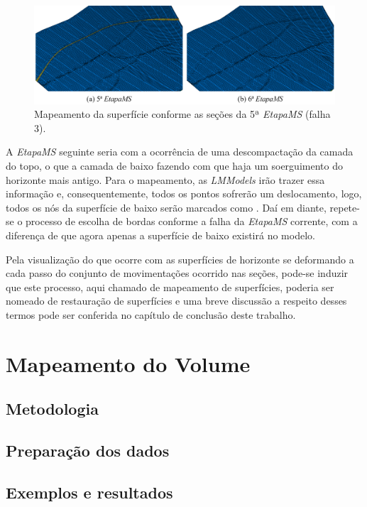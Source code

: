 \begin{figure} [H]
  \begin{center}
    \includegraphics[width=\textwidth]{images/fig-example-2-12}
    \caption{Mapeamento da superfície conforme as seções da 5ª \textit{EtapaMS} (falha 3).}\label{fig-example-2-12}
  \end{center}
\end{figure}

A \textit{EtapaMS} seguinte seria com a ocorrência de uma descompactação da camada do topo, o que  a camada de baixo fazendo com que haja um soerguimento do horizonte mais antigo. Para o mapeamento, as \textit{LMModels} irão trazer essa informação e, consequentemente, todos os pontos sofrerão um deslocamento, logo, todos os nós da superfície de baixo serão marcados como . Daí em diante, repete-se o processo de escolha de bordas conforme a falha da \textit{EtapaMS} corrente, com a diferença de que agora apenas a superfície de baixo existirá no modelo.

Pela visualização do que ocorre com as superfícies de horizonte se deformando a cada passo do conjunto de movimentações ocorrido nas seções, pode-se induzir que este processo, aqui chamado de mapeamento de superfícies, poderia ser nomeado de restauração de superfícies e uma breve discussão a respeito desses termos pode ser conferida no capítulo de conclusão deste trabalho.

\section{Mapeamento do Volume}

\subsection{Metodologia}

\subsection{Preparação dos dados}

\subsection{Exemplos e resultados}



